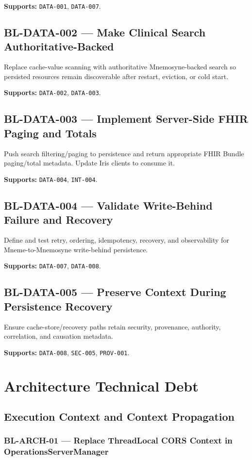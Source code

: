 \textbf{Supports:} \texttt{DATA-001}, \texttt{DATA-007}.

\subsection{BL-DATA-002 --- Make Clinical Search Authoritative-Backed}
Replace cache-value scanning with authoritative Mnemosyne-backed search so persisted resources remain discoverable after restart, eviction, or cold start.

\textbf{Supports:} \texttt{DATA-002}, \texttt{DATA-003}.

\subsection{BL-DATA-003 --- Implement Server-Side FHIR Paging and Totals}
Push search filtering/paging to persistence and return appropriate FHIR Bundle paging/total metadata. Update Iris clients to consume it.

\textbf{Supports:} \texttt{DATA-004}, \texttt{INT-004}.

\subsection{BL-DATA-004 --- Validate Write-Behind Failure and Recovery}
Define and test retry, ordering, idempotency, recovery, and observability for Mneme-to-Mnemosyne write-behind persistence.

\textbf{Supports:} \texttt{DATA-007}, \texttt{DATA-008}.

\subsection{BL-DATA-005 --- Preserve Context During Persistence Recovery}
Ensure cache-store/recovery paths retain security, provenance, authority, correlation, and causation metadata.

\textbf{Supports:} \texttt{DATA-008}, \texttt{SEC-005}, \texttt{PROV-001}.

\section{Architecture Technical Debt}
\subsection{Execution Context and Context Propagation}
\subsubsection{BL-ARCH-01 --- Replace ThreadLocal CORS Context in OperationsServerManager}
